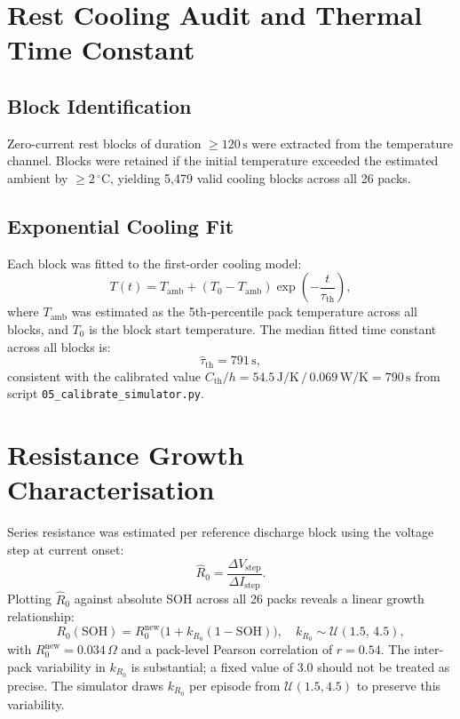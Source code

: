 \section{Rest Cooling Audit and Thermal Time Constant}

\subsection{Block Identification}

Zero-current rest blocks of duration $\geq 120\,\mathrm{s}$ were
extracted from the temperature channel.  Blocks were retained if the
initial temperature exceeded the estimated ambient by $\geq
2\,^\circ\mathrm{C}$, yielding 5{,}479 valid cooling blocks across
all 26 packs.

\subsection{Exponential Cooling Fit}

Each block was fitted to the first-order cooling model:
\begin{equation}
  T(t) = T_{\mathrm{amb}} + (T_0 - T_{\mathrm{amb}})
  \exp\!\left(-\frac{t}{\tau_{\mathrm{th}}}\right),
  \label{eq:cooling_model}
\end{equation}
where $T_{\mathrm{amb}}$ was estimated as the 5th-percentile pack
temperature across all blocks, and $T_0$ is the block start
temperature.  The median fitted time constant across all blocks is:
\begin{equation}
  \hat{\tau}_{\mathrm{th}} = 791\,\mathrm{s},
\end{equation}
consistent with the calibrated value $C_{\mathrm{th}} / h =
54.5\,\mathrm{J/K} \,/\, 0.069\,\mathrm{W/K} = 790\,\mathrm{s}$
from script \texttt{05\_calibrate\_simulator.py}.

\section{Resistance Growth Characterisation}
\label{sec:resistance_growth}

Series resistance was estimated per reference discharge block using the
voltage step at current onset:
\begin{equation}
  \hat{R}_0 = \frac{\Delta V_{\mathrm{step}}}{\Delta I_{\mathrm{step}}}.
  \label{eq:r0_estimate}
\end{equation}
Plotting $\hat{R}_0$ against absolute SOH across all 26 packs
reveals a linear growth relationship:
\begin{equation}
  R_0(\mathrm{SOH}) = R_0^{\mathrm{new}}
  \bigl(1 + k_{R_0}(1 - \mathrm{SOH})\bigr),
  \quad k_{R_0} \sim \mathcal{U}(1.5,\, 4.5),
  \label{eq:r0_growth}
\end{equation}
with $R_0^{\mathrm{new}} = 0.034\,\Omega$ and a pack-level Pearson
correlation of $r = 0.54$.  The inter-pack variability in $k_{R_0}$
is substantial; a fixed value of 3.0 should not be treated as
precise.  The simulator draws $k_{R_0}$ per episode from
$\mathcal{U}(1.5, 4.5)$ to preserve this variability.
